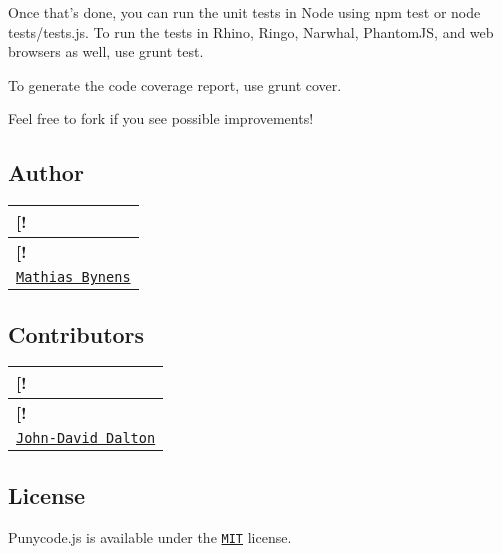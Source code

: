 Once that’s done, you can run the unit tests in Node using {\ttfamily npm test} or {\ttfamily node tests/tests.\+js}. To run the tests in Rhino, Ringo, Narwhal, Phantom\+JS, and web browsers as well, use {\ttfamily grunt test}.

To generate the code coverage report, use {\ttfamily grunt cover}.

Feel free to fork if you see possible improvements!

\subsection*{Author}

\tabulinesep=1mm
\begin{longtabu} spread 0pt [c]{*{1}{|X[-1]}|}
\hline
\rowcolor{\tableheadbgcolor}\textbf{ \mbox{[}!   }\\
\endfirsthead
\hline
\endfoot
\hline
\rowcolor{\tableheadbgcolor}\textbf{ \mbox{[}!   }\\
\endhead
\href{https://mathiasbynens.be/}{\tt Mathias Bynens}   \\
\end{longtabu}


\subsection*{Contributors}

\tabulinesep=1mm
\begin{longtabu} spread 0pt [c]{*{1}{|X[-1]}|}
\hline
\rowcolor{\tableheadbgcolor}\textbf{ \mbox{[}!   }\\
\endfirsthead
\hline
\endfoot
\hline
\rowcolor{\tableheadbgcolor}\textbf{ \mbox{[}!   }\\
\endhead
\href{http://allyoucanleet.com/}{\tt John-\/\+David Dalton}   \\
\end{longtabu}


\subsection*{License}

Punycode.\+js is available under the \href{https://mths.be/mit}{\tt M\+IT} license. 